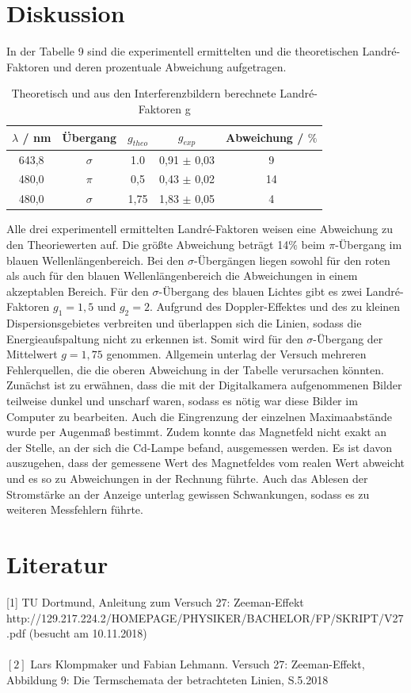 \documentclass{article}
\begin{document}
\section{Diskussion}
In der Tabelle 9 sind die experimentell ermittelten und die theoretischen Landré-Faktoren und deren prozentuale Abweichung aufgetragen. 

\begin{table} [H]
	\centering
	\caption{Theoretisch und aus den Interferenzbildern berechnete Landré-Faktoren g}
	\label {tab:threecols}
	\begin{tabular}{c|c|c|c|c} \hline		
		$\lambda$ / nm & Übergang & $g_{theo}$ & $g_{exp}$ &  Abweichung / $\%$\\ 
		\hline 
		643,8& $\sigma$& 1.0 &0,91 $\pm$ 0,03 &9\\
		480,0&$\pi$&0,5&0,43 $\pm$ 0,02& 14\\
		480,0& $\sigma$&1,75&1,83 $\pm$ 0,05&4\\
		
		
		\hline
	\end{tabular} 	
	
	\label {tab:threecols}
\end{table}

Alle drei experimentell ermittelten Landré-Faktoren weisen eine Abweichung zu den Theoriewerten auf. Die größte Abweichung beträgt 14$\%$ beim $\pi$-Übergang im blauen Wellenlängenbereich. Bei den $\sigma$-Übergängen liegen sowohl für den roten als auch für den blauen Wellenlängenbereich die Abweichungen in einem akzeptablen Bereich. Für den $\sigma$-Übergang des blauen Lichtes gibt es zwei Landré-Faktoren $g_1=1,5$ und $g_2=2$. Aufgrund des Doppler-Effektes und des zu kleinen Dispersionsgebietes verbreiten und überlappen sich die Linien, sodass die Energieaufspaltung nicht zu erkennen ist. Somit wird für den $\sigma$-Übergang der Mittelwert $g=1,75$ genommen. Allgemein unterlag der Versuch mehreren Fehlerquellen, die die oberen Abweichung in der Tabelle verursachen könnten. Zunächst ist zu erwähnen, dass die mit der Digitalkamera aufgenommenen Bilder teilweise dunkel und unscharf waren, sodass es nötig war diese Bilder im Computer zu bearbeiten. Auch die Eingrenzung der einzelnen Maximaabstände wurde per Augenmaß bestimmt. Zudem konnte das Magnetfeld nicht exakt an der Stelle, an der sich die Cd-Lampe befand, ausgemessen werden. Es ist davon auszugehen, dass der gemessene Wert des Magnetfeldes vom realen Wert abweicht und es so zu Abweichungen in der Rechnung führte. Auch das Ablesen der Stromstärke an der Anzeige unterlag gewissen Schwankungen, sodass es zu weiteren Messfehlern führte. 
\section{Literatur}
[1] TU Dortmund, Anleitung zum Versuch 27: Zeeman-Effekt\\
http://129.217.224.2/HOMEPAGE/PHYSIKER/BACHELOR/FP/SKRIPT/V27.pdf (besucht am 10.11.2018)\\\\
$[2]$ Lars Klompmaker und Fabian Lehmann. Versuch 27: Zeeman-Effekt, Abbildung 9: Die Termschemata der betrachteten Linien, S.5.2018
\end{document}
